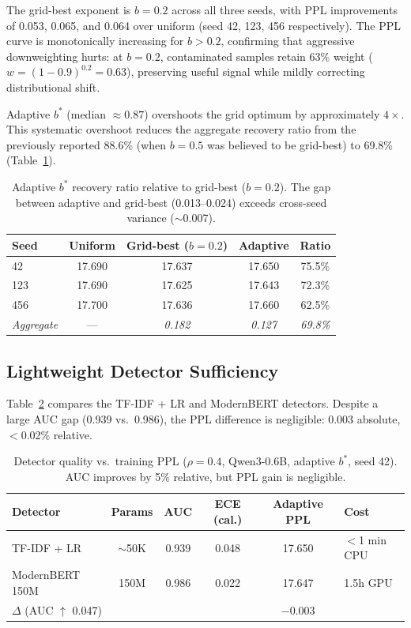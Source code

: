 \documentclass[11pt]{article}
\begin{document}
The grid-best exponent is $b = 0.2$ across all three seeds, with PPL improvements of 0.053, 0.065, and 0.064 over uniform (seed 42, 123, 456 respectively).
The PPL curve is monotonically increasing for $b > 0.2$, confirming that aggressive downweighting hurts: at $b = 0.2$, contaminated samples retain 63\% weight ($w = (1-0.9)^{0.2} = 0.63$), preserving useful signal while mildly correcting distributional shift.

Adaptive $b^*$ (median $\approx 0.87$) overshoots the grid optimum by approximately $4\times$.
This systematic overshoot reduces the aggregate recovery ratio from the previously reported 88.6\% (when $b = 0.5$ was believed to be grid-best) to 69.8\% (Table~\ref{tab:ratio}).

\begin{table}[t]
\centering
\caption{Adaptive $b^*$ recovery ratio relative to grid-best ($b = 0.2$). The gap between adaptive and grid-best (0.013--0.024) exceeds cross-seed variance ($\sim$0.007).}
\label{tab:ratio}
\small
\begin{tabular}{lcccc}
\toprule
Seed & Uniform & Grid-best ($b\!=\!0.2$) & Adaptive & Ratio \\
\midrule
42  & 17.690 & 17.637 & 17.650 & 75.5\% \\
123 & 17.690 & 17.625 & 17.643 & 72.3\% \\
456 & 17.700 & 17.636 & 17.660 & 62.5\% \\
\midrule
\textit{Aggregate} & --- & \textit{0.182} & \textit{0.127} & \textit{69.8\%} \\
\bottomrule
\end{tabular}
\end{table}

\subsection{Lightweight Detector Sufficiency}
\label{sec:detector}

Table~\ref{tab:detector} compares the TF-IDF + LR and ModernBERT detectors.
Despite a large AUC gap (0.939 vs.\ 0.986), the PPL difference is negligible: 0.003 absolute, $<$0.02\% relative.

\begin{table}[t]
\centering
\caption{Detector quality vs.\ training PPL ($\rho = 0.4$, Qwen3-0.6B, adaptive $b^*$, seed 42). AUC improves by 5\% relative, but PPL gain is negligible.}
\label{tab:detector}
\small
\begin{tabular}{lccccl}
\toprule
Detector & Params & AUC & ECE (cal.) & Adaptive PPL & Cost \\
\midrule
TF-IDF + LR   & $\sim$50K & 0.939 & 0.048 & 17.650 & $<$1 min CPU \\
ModernBERT 150M & 150M     & 0.986 & 0.022 & 17.647 & 1.5h GPU \\
\midrule
\multicolumn{2}{l}{$\Delta$ (AUC $\uparrow$ 0.047)} & & & $-$0.003 & \\
\bottomrule
\end{tabular}
\end{table}
\end{document}
